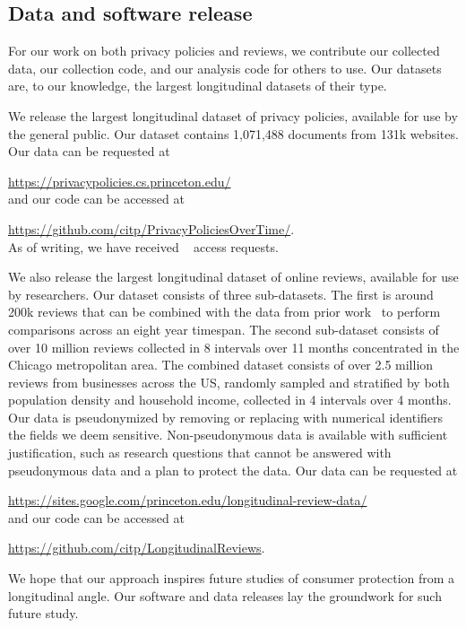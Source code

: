\subsection{Data and software release} \label{sec:intro:datarelease}
For our work on both privacy policies and reviews, we contribute our collected data, our collection code, and our analysis code for others to use. Our datasets are, to our knowledge, the largest longitudinal datasets of their type.

We release the largest longitudinal dataset of privacy policies, available for use by the general public. Our dataset contains 1,071,488 documents from 131k websites. Our data can be requested at \par
\url{https://privacypolicies.cs.princeton.edu/}\\
 and our code can be accessed at \par
\url{https://github.com/citp/PrivacyPoliciesOverTime/}.\\ As of writing, we have received \policyrequests~ access requests.

We also release the largest longitudinal dataset of online reviews, available for use by researchers. Our dataset consists of three sub-datasets. The first is around 200k reviews that can be combined with the data from prior work~\cite{mukherjee2013yelp} to perform comparisons across an eight year timespan. The second sub-dataset consists of over 10 million reviews collected in 8 intervals over 11 months concentrated in the Chicago metropolitan area. The combined dataset consists of over 2.5 million reviews from businesses across the US, randomly sampled and stratified by both population density and household income, collected in 4 intervals over 4 months. Our data is pseudonymized by removing or replacing with numerical identifiers the fields we deem sensitive. Non-pseudonymous data is available with sufficient justification, such as research questions that cannot be answered with pseudonymous data and a plan to protect the data. Our data can be requested at\par
\url{https://sites.google.com/princeton.edu/longitudinal-review-data/}\\
and our code can be accessed at\par
\url{https://github.com/citp/LongitudinalReviews}.

We hope that our approach inspires future studies of consumer protection from a longitudinal angle. Our software and data releases lay the groundwork for such future study. 

